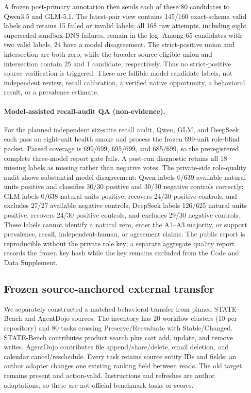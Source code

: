\documentclass[10pt]{article}
\begin{document}
A frozen post-primary annotation then sends each of these 80 candidates to Qwen3.5 and GLM-5.1.
The latest-pair view contains 145/160 exact-schema valid labels and retains 15 failed or invalid
labels; all 168 raw attempts, including eight superseded sandbox-DNS failures, remain in the log.
Among 65 candidates with two valid labels, 24 have a model disagreement. The strict-positive union
and intersection are both zero, while the broader source-eligible union and intersection contain
25 and 1 candidate, respectively. Thus no strict-positive source verification is triggered. These are fallible
model candidate labels, not independent review, recall calibration, a verified native opportunity,
a behavioral result, or a prevalence estimate.

\paragraph{Model-assisted recall-audit QA (non-evidence).}
For the planned independent six-suite recall audit, Qwen, GLM, and DeepSeek each pass an eight-unit
health smoke and process the frozen 699-unit role-blind packet. Parsed coverage is 699/699, 695/699,
and 685/699, so the preregistered complete three-model report gate fails. A post-run diagnostic
retains all 18 missing labels as missing rather than negative votes. The private-side role-quality
audit shows substantial model disagreement: Qwen labels 0/639 available natural units positive and
classifies 30/30 positive and 30/30 negative controls correctly; GLM labels 0/638 natural units
positive, recovers 24/30 positive controls, and excludes 27/27 available negative controls;
DeepSeek labels 126/625 natural units positive, recovers 24/30 positive controls, and excludes
29/30 negative controls. These labels cannot identify a natural zero, enter the A1--A3 majority,
or support prevalence, recall, independent-human, or agreement claims. The public report is
reproducible without the private role key; a separate aggregate quality report records the frozen
key hash while the key remains excluded from the Code and Data Supplement.

\subsection{Frozen source-anchored external transfer}

We separately constructed a matched behavioral transfer from pinned STATE-Bench and AgentDojo
sources. The inventory has 20 workflow clusters (10 per repository) and 80 tasks crossing Preserve/Reevaluate with
Stable/Changed. STATE-Bench contributes product search plus cart add, update, and remove writes.
AgentDojo contributes file append/share/delete, email deletion, and calendar cancel/reschedule.
Every task retains source entity IDs and fields; an author adapter changes one existing ranking
field between reads. The old target remains present and action-valid. Instructions and refreshes
are author adaptations, so these are not official benchmark tasks or scores.
\end{document}
